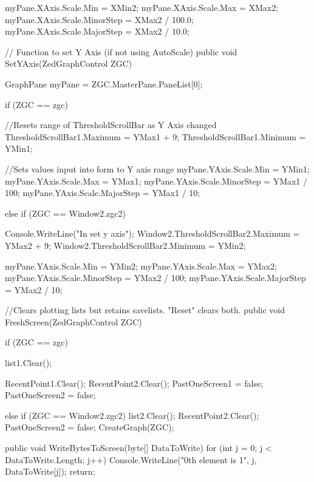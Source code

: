{{{{                myPane.XAxis.Scale.Min = XMin2;
                myPane.XAxis.Scale.Max = XMax2;
                myPane.XAxis.Scale.MinorStep = XMax2 / 100.0;
                myPane.XAxis.Scale.MajorStep = XMax2 / 10.0;
            }
        }

      
        // Function to set Y Axis (if not using AutoScale)
        public void SetYAxis(ZedGraphControl ZGC)
        {
            GraphPane myPane = ZGC.MasterPane.PaneList[0];

            if (ZGC == zgc)
            {
                //Resets range of ThresholdScrollBar as Y Axis changed
                ThresholdScrollBar1.Maximum = YMax1 + 9;
                ThresholdScrollBar1.Minimum = YMin1;

                //Sets values input into form to Y axis range
                myPane.YAxis.Scale.Min = YMin1;
                myPane.YAxis.Scale.Max = YMax1;
                myPane.YAxis.Scale.MinorStep = YMax1 / 100;
                myPane.YAxis.Scale.MajorStep = YMax1 / 10;
            }
            else if (ZGC == Window2.zgc2)
            {
                Console.WriteLine("In set y axis");
                Window2.ThresholdScrollBar2.Maximum = YMax2 + 9;
                Window2.ThresholdScrollBar2.Minimum = YMin2;

                myPane.YAxis.Scale.Min = YMin2;
                myPane.YAxis.Scale.Max = YMax2;
                myPane.YAxis.Scale.MinorStep = YMax2 / 100;
                myPane.YAxis.Scale.MajorStep = YMax2 / 10;
            }
        }

        //Clears plotting lists but retains savelists. "Reset" clears both.
        public void FreshScreen(ZedGraphControl ZGC)
        {
            if (ZGC == zgc)
            {
                list1.Clear();

                RecentPoint1.Clear();
                RecentPoint2.Clear();
                PastOneScreen1 = false;
                PastOneScreen2 = false;
            }
            else if (ZGC == Window2.zgc2)
            {
                list2.Clear();
                RecentPoint2.Clear();
                PastOneScreen2 = false;
            }
            CreateGraph(ZGC);
        }

        public void WriteBytesToScreen(byte[] DataToWrite)
        {
            for (int j = 0; j < DataToWrite.Length; j++)
            {
                Console.WriteLine("{0}th element is {1}", j, DataToWrite[j]);
            }
            return;
        }


}}
